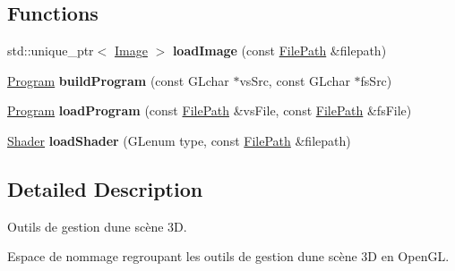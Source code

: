 \subsection*{Functions}
\begin{DoxyCompactItemize}
\item 
\mbox{\label{namespaceglimac_a7d92f451f5235a3299fa0faef1a335f5}} 
std\+::unique\+\_\+ptr$<$ \hyperlink{classglimac_1_1Image}{Image} $>$ {\bfseries load\+Image} (const \hyperlink{classglimac_1_1FilePath}{File\+Path} \&filepath)
\item 
\mbox{\label{namespaceglimac_a3d534d78277f9bab3c4fa83f263f3633}} 
\hyperlink{classglimac_1_1Program}{Program} {\bfseries build\+Program} (const G\+Lchar $\ast$vs\+Src, const G\+Lchar $\ast$fs\+Src)
\item 
\mbox{\label{namespaceglimac_a9c42759cac55f7ef947d2972b19e18a6}} 
\hyperlink{classglimac_1_1Program}{Program} {\bfseries load\+Program} (const \hyperlink{classglimac_1_1FilePath}{File\+Path} \&vs\+File, const \hyperlink{classglimac_1_1FilePath}{File\+Path} \&fs\+File)
\item 
\mbox{\label{namespaceglimac_aa154f6bbc6caafaa2b8aa5e4dc433523}} 
\hyperlink{classglimac_1_1Shader}{Shader} {\bfseries load\+Shader} (G\+Lenum type, const \hyperlink{classglimac_1_1FilePath}{File\+Path} \&filepath)
\end{DoxyCompactItemize}


\subsection{Detailed Description}
Outils de gestion d\textquotesingle{}une scène 3D. 

Espace de nommage regroupant les outils de gestion d\textquotesingle{}une scène 3D en Open\+GL. 